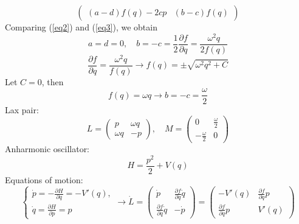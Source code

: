 \documentclass[12pt]{article}
\theoremstyle{definition}
\begin{document}
\begin{enumerate}
\begin{equation}
\begin{pmatrix}
            (a-d)f(q)-2cp & (b-c)f(q)
        \end{pmatrix}
    \end{equation}
    Comparing (\ref{eq2}) and (\ref{eq3}), we obtain
    \begin{equation}
        a=d=0,\quad b=-c=\frac{1}{2}\frac{\partial f}{\partial q}=\frac{\omega^2q}{2f(q)}
    \end{equation}
    \begin{equation}
        \frac{\partial f}{\partial q}=\frac{\omega^2q}{f(q)}\rightarrow f(q)=\pm\sqrt{\omega^2q^2+C}
    \end{equation}
    Let $C=0$, then
    \begin{equation}
        f(q)=\omega q\rightarrow b=-c=\frac{\omega}{2}
    \end{equation}
    Lax pair:
    \begin{equation}
        \boxed{L=\begin{pmatrix}
            p & \omega q\\
            \omega q & -p
        \end{pmatrix},\quad M=\begin{pmatrix}
            0 & \frac{\omega}{2}\\
            -\frac{\omega}{2} & 0
        \end{pmatrix}}
    \end{equation}
    Anharmonic oscillator:
    \begin{equation}
        H=\frac{p^2}{2}+V(q)
    \end{equation}
    Equations of motion:
    \begin{equation}\label{eq4}
        \begin{cases}
            \dot{p}=-\frac{\partial H}{\partial q}=-V'(q),\\
            \dot{q}=\frac{\partial H}{\partial p}=p
        \end{cases}\rightarrow\dot{L}=\begin{pmatrix}
            \dot{p} & \frac{\partial f}{\partial q}\dot{q}\\
            \frac{\partial f}{\partial q}\dot{q} & -\dot{p}
        \end{pmatrix}=\begin{pmatrix}
            -V'(q) & \frac{\partial f}{\partial q}p\\
            \frac{\partial f}{\partial q}p & V'(q)
        \end{pmatrix}
    \end{equation}

\end{enumerate}
\end{document}
